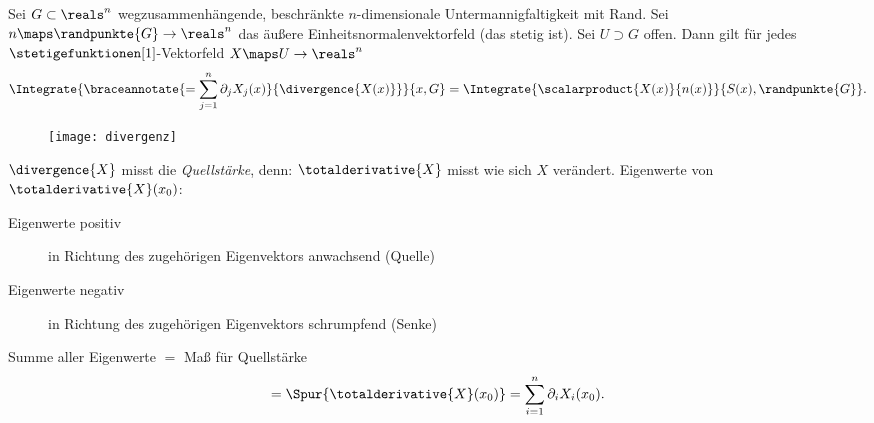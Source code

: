 \begin{satz}\label{integralsatz_gauss}
  Sei \( G\subset \reals^n \) wegzusammenhängende, beschränkte \( n \)-dimensionale Untermannigfaltigkeit mit Rand. Sei \( n\maps \randpunkte{G}\to \reals^n \) das äußere Einheitsnormalenvektorfeld (das stetig ist). Sei \( U\supset G \) offen. Dann gilt für jedes \( \stetigefunktionen[1] \)-Vektorfeld \( X\maps U\to \reals^n \)
  \begin{equation*}
    \Integrate{\braceannotate{=\sum_{j=1}^{n}\partial_j X_j(x)}{\divergence{X(x)}}}{x,G}=\Integrate{\scalarproduct{X(x)}{n(x)}}{S(x),\randpunkte{G}}.
  \end{equation*}
\end{satz}
\begin{figure}[H]
  \centering
  \texttt{[image: divergenz]}
  \label{fig:divergenz}
\end{figure}
\( \divergence{X} \) misst die \emph{Quellstärke}, denn: \( \totalderivative{X} \) misst wie sich \( X \) verändert. Eigenwerte von \( \totalderivative{X}(x_0) \): 
\begin{description}
  \item[Eigenwerte positiv] \tto in Richtung des zugehörigen Eigenvektors anwachsend (Quelle)
  \item[Eigenwerte negativ] \tto in Richtung des zugehörigen Eigenvektors schrumpfend (Senke)
\end{description}
Summe aller Eigenwerte \( = \) Maß für Quellstärke
\begin{equation*}
  =\Spur{\totalderivative{X}(x_0)}=\sum_{i=1}^{n}\partial_i X_i(x_0).
\end{equation*}